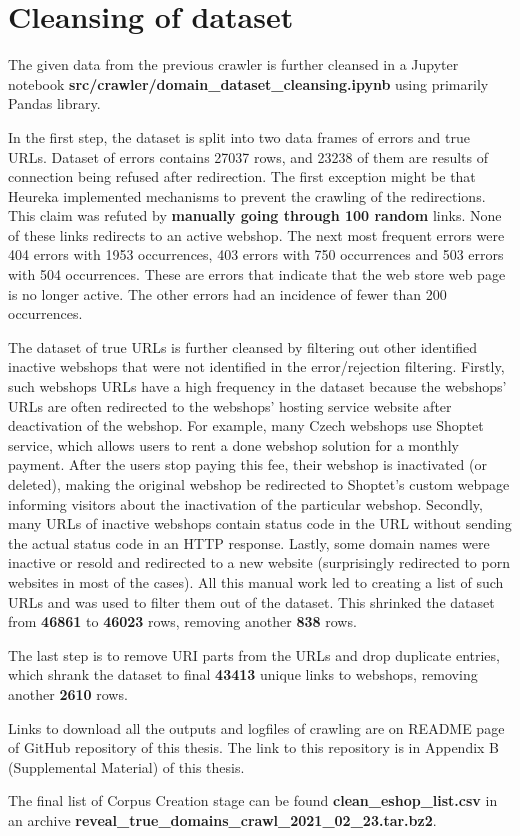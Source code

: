 \section{Cleansing of dataset}

The given data from the previous crawler is further cleansed in a Jupyter notebook \textbf{src\string/crawler\string/domain\_dataset\_cleansing.ipynb} using primarily Pandas library.

In the first step, the dataset is split into two data frames of errors and true URLs. Dataset of errors contains 27037 rows, and 23238 of them are results of connection being refused after redirection. The first exception might be that Heureka implemented mechanisms to prevent the crawling of the redirections. This claim was refuted by \textbf{manually going through 100 random} links. None of these links redirects to an active webshop. The next most frequent errors were 404 errors with 1953 occurrences, 403 errors with 750 occurrences and 503 errors with 504 occurrences. These are errors that indicate that the web store web page is no longer active. The other errors had an incidence of fewer than 200 occurrences.

The dataset of true URLs is further cleansed by filtering out other identified inactive webshops that were not identified in the error/rejection filtering. Firstly, such webshops URLs have a high frequency in the dataset because the webshops' URLs are often redirected to the webshops' hosting service website after deactivation of the webshop. For example, many Czech webshops use Shoptet service, which allows users to rent a done webshop solution for a monthly payment. After the users stop paying this fee, their webshop is inactivated (or deleted), making the original webshop be redirected to Shoptet's custom webpage informing visitors about the inactivation of the particular webshop. Secondly, many URLs of inactive webshops contain status code in the URL without sending the actual status code in an HTTP response. Lastly, some domain names were inactive or resold and redirected to a new website (surprisingly redirected to porn websites in most of the cases). All this manual work led to creating a list of such URLs and was used to filter them out of the dataset. This shrinked the dataset from \textbf{46861} to \textbf{46023} rows, removing another \textbf{838} rows.

The last step is to remove URI parts from the URLs and drop duplicate entries, which shrank the dataset to final \textbf{43413} unique links to webshops, removing another \textbf{2610} rows.

Links to download all the outputs and logfiles of crawling are on README page of GitHub repository of this thesis. The link to this repository is in Appendix B (Supplemental Material) of this thesis.

The final list of Corpus Creation stage can be found \textbf{clean\_eshop\_list.csv} in an archive \textbf{reveal\_true\_domains\_crawl\_2021\_02\_23.tar.bz2}.

